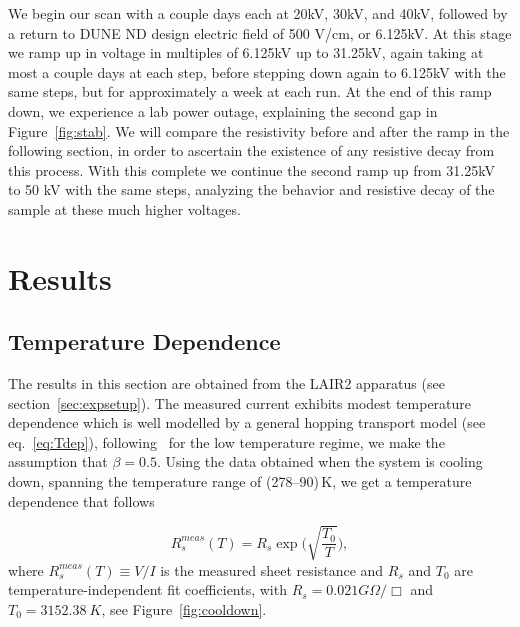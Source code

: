 \documentclass[a4paper,12pt]{article}
\begin{document}
We begin our scan with a couple days each at 20kV, 30kV, and 40kV, followed by a return to DUNE ND design electric field of 500 V/cm, or 6.125kV. At this stage we ramp up in voltage in multiples of 6.125kV up to 31.25kV, again taking at most a couple days at each step, before stepping down again to 6.125kV with the same steps, but for approximately a week at each run.
At the end of this ramp down, we experience a lab power outage, explaining the second gap in Figure~\ref{fig:stab}. We will compare the resistivity before and after the ramp in the following section, in order to ascertain the existence of any resistive decay from this process. With this complete we continue the second ramp up from 31.25kV to 50 kV with the same steps, analyzing the behavior and resistive decay of the sample at these much higher voltages.



\section{Results}
\label{sec:res}
\subsection{Temperature Dependence}
\label{sec:TNEFit}
The results in this section are obtained from the LAIR2 apparatus (see section~\ref{sec:expsetup}). The measured current exhibits modest temperature dependence which is well modelled by a general hopping transport model (see eq.~\ref{eq:Tdep}), following~\cite{electronicPhotonicMaterials} for the low temperature regime, we make the assumption that $\beta=0.5$. Using the data obtained when the system is cooling down, spanning the temperature range of (278--90)\,K, we get a temperature dependence that follows

\begin{equation}
\label{Rmeas}
R_{s}^{meas}(T)=R_s\exp\bigg(\sqrt{\frac{T_0}{T}}\bigg),
\end{equation}
where $R_{s}^{meas}(T)\equiv V/I$ is the measured sheet resistance and $R_{s}$ and $T_0$ are temperature-independent fit coefficients, with $R_s =0.021 G\Omega/\Box$ and $T_0 = 3152.38~K$, see Figure~\ref{fig:cooldown}. 
\end{document}
